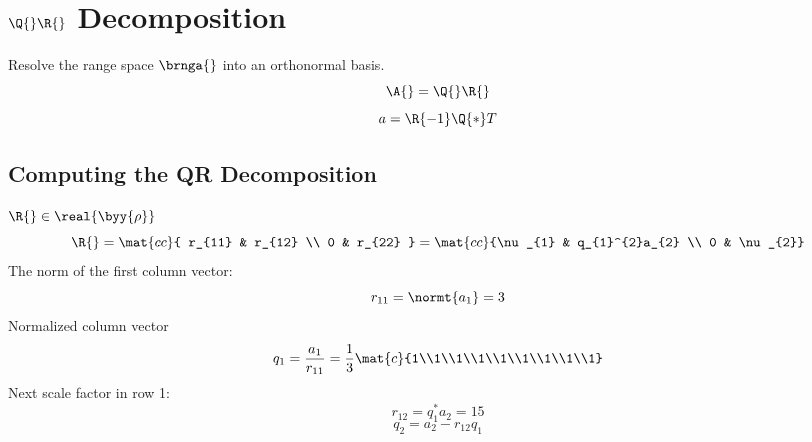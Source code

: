 \break
\clearpage
\section{$\Q{}\R{}$ Decomposition}  %
Resolve the range space $\brnga{}$ into an orthonormal basis.
  \begin{equation*}   %
    \A{} = \Q{} \R{}
  \end{equation*}
  \begin{equation*}   %
    a = \R{-1}\Q{*}T
  \end{equation*}
  
\subsection{Computing the QR Decomposition}  %
$\R{}\in\real{\byy{\rho}}$
  \begin{equation*}   %
    \R{} = \mat{cc}{ r_{11} & r_{12} \\ 0 & r_{22} } = \mat{cc}{\nu_{1} & q_{1}^{2}a_{2} \\ 0 & \nu_{2}}
  \end{equation*}
The norm of the first column vector:
  \begin{equation}
        r_{11} = \normt{a_{1}} = 3
  \end{equation}
Normalized column vector
  \begin{equation}
        q_{1} = \frac{a_{1}} {r_{11}} = \frac{1}{3}\mat{c}{1\\1\\1\\1\\1\\1\\1\\1\\1}
  \end{equation}
Next scale factor in row 1:
  \begin{equation}
        r_{12} = q_{1}^{*}a_{2} = 15
  \end{equation}
  \begin{equation}
        q_{2} = a_{2} - r_{12} q_{1}
  \end{equation}
